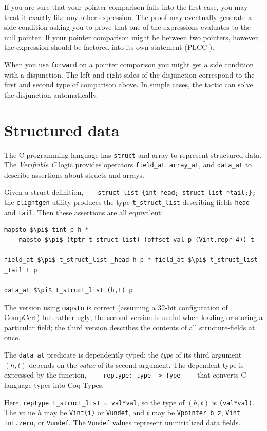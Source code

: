 \documentclass[12pt,fleqn,openany,oneside,showtrims]{memoir}
\newcommand{\ychapter}[2]{\chapter[#1]{#1 \hfill \normalsize #2}}
\begin{document}
If you are sure that your pointer comparison falls into the first case, you may
treat it exactly like any other expression. The proof may eventually generate a
side-condition asking you to prove that one of the expressions evaluates to the
null pointer. If your pointer comparison might be between two pointers, however, 
the expression should be factored into its own statement (PLCC
). 

When you use \lstinline|forward| on a pointer comparison you might get a side
condition with a disjunction. The left and right sides of the disjunction
correspond to the first and second type of comparison above. In simple cases,
the tactic can solve the disjunction automatically.

\ychapter{Structured data}{}
\label{refcard:structured}
The C programming language has \lstinline{struct} and array
to represent structured data.  The \emph{Verifiable C} logic
provides operators \lstinline{field_at},
\lstinline{array_at}, and \lstinline{data_at} to describe
assertions about structs and arrays.

Given a struct definition,~~~~\lstinline|struct list {int head; struct list *tail;};|\newline
the \lstinline{clightgen} utility produces the
type \lstinline{t_struct_list} describing fields
\lstinline{head} and \lstinline{tail}.
Then these assertions are all equivalent:

\begin{lstlisting}
mapsto $\pi$ tint p h * 
    mapsto $\pi$ (tptr t_struct_list) (offset_val p (Vint.repr 4)) t

field_at $\pi$ t_struct_list _head h p * field_at $\pi$ t_struct_list _tail t p

data_at $\pi$ t_struct_list (h,t) p
\end{lstlisting}
The version using \lstinline{mapsto} is correct (assuming a 32-bit 
configuration of CompCert) but rather ugly;
the second version is useful when loading or storing a
particular field; the third version describes the contents
of all structure-fields at once.

The \lstinline{data_at} predicate is dependently typed;
the \emph{type} of its third argument $(h,t)$
depends on the \emph{value} of its second argument.
The dependent type is expressed by the
function,
$\qquad$\lstinline{reptype: type -> Type}$\qquad$
that converts C-language types into Coq Types.

Here, \lstinline{reptype t_struct_list = val*val}, so
the type of $(h,t)$ is \lstinline{(val*val)}.
The value $h$ may be \lstinline{Vint(i)} or \lstinline{Vundef},
and $t$ may be \lstinline{Vpointer b z},
\lstinline{Vint Int.zero}, or \lstinline{Vundef}.
The \lstinline{Vundef} values represent uninitialized
data fields.
\end{document}
